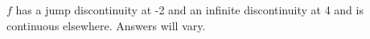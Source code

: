 {$f$ has a jump discontinuity at -2 and an infinite discontinuity at 4 and is continuous elsewhere.}
{Answers will vary.}
